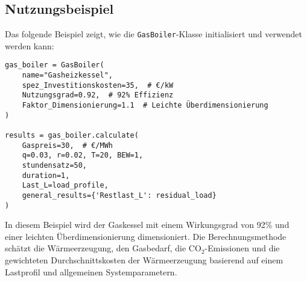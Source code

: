 \subsection{Nutzungsbeispiel}
Das folgende Beispiel zeigt, wie die \texttt{GasBoiler}-Klasse initialisiert und verwendet werden kann:

\begin{verbatim}
gas_boiler = GasBoiler(
    name="Gasheizkessel",
    spez_Investitionskosten=35,  # €/kW
    Nutzungsgrad=0.92,  # 92% Effizienz
    Faktor_Dimensionierung=1.1  # Leichte Überdimensionierung
)

results = gas_boiler.calculate(
    Gaspreis=30,  # €/MWh
    q=0.03, r=0.02, T=20, BEW=1, 
    stundensatz=50, 
    duration=1, 
    Last_L=load_profile, 
    general_results={'Restlast_L': residual_load}
)
\end{verbatim}

In diesem Beispiel wird der Gaskessel mit einem Wirkungsgrad von 92\% und einer leichten Überdimensionierung dimensioniert. Die Berechnungsmethode schätzt die Wärmeerzeugung, den Gasbedarf, die CO$_2$-Emissionen und die gewichteten Durchschnittskosten der Wärmeerzeugung basierend auf einem Lastprofil und allgemeinen Systemparametern.
